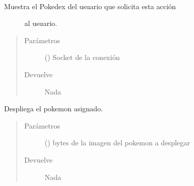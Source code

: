 \documentclass[letterpaper,10pt,spanish,openany,oneside]{sphinxmanual}
\begin{document}

\begin{fulllineitems}
\label{\detokenize{pokemonClient:pokemonClient.muestraPokedex}}~\begin{description}
\item[{Muestra el Pokedex del usuario que solicita esta acción}] \leavevmode
al usuario.

\end{description}
\begin{quote}\begin{description}
\item[{Parámetros}] \leavevmode
{} () \textendash{} Socket de la conexión

\item[{Devuelve}] \leavevmode
Nada

\end{description}\end{quote}

\end{fulllineitems}


\begin{fulllineitems}
\label{\detokenize{pokemonClient:pokemonClient.muestraPokemon}}
Despliega el pokemon asignado.
\begin{quote}\begin{description}
\item[{Parámetros}] \leavevmode
{} () \textendash{} bytes de la imagen del pokemon a desplegar

\item[{Devuelve}] \leavevmode
Nada

\end{description}\end{quote}

\end{fulllineitems}
\end{document}
